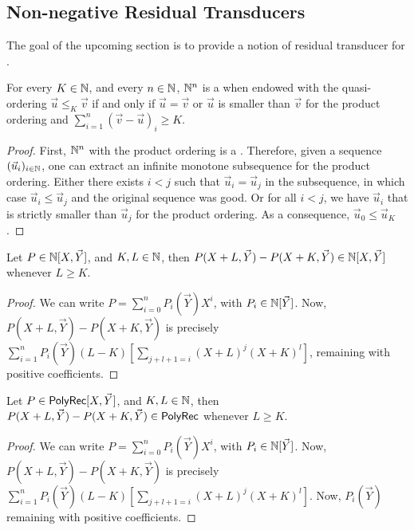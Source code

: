 \subsection{Non-negative Residual Transducers}

The goal of the upcoming section is to provide a notion of residual transducer
for  .

\begin{fact}
    For every $K \in \mathbb{N}$, and every $n \in \mathbb{N}$,
    $\mathbb{N}^n$ is a 
    when endowed with the quasi-ordering $\vec{u} \leq_K \vec{v}$
    if and only if $\vec{u} = \vec{v}$ or
    $\vec{u}$ is smaller than $\vec{v}$ for the product ordering and
    $\sum_{i = 1}^n  (\vec{v} - \vec{u})_i \geq K$.
\end{fact}
\begin{proof}
    First, $\mathbb{N}^n$ with the product ordering is a .
    Therefore, given a sequence $(\vec{u}_i)_{i \in \mathbb{N}}$,
    one can extract an infinite monotone subsequence for
    the product ordering.
    Either there exists $i < j$ such that $\vec{u}_i = \vec{u}_j$
    in the subsequence, in which case $\vec{u}_i \leq \vec{u}_j$
    and the original sequence was good. Or for all $i < j$,
    we have $\vec{u}_i$ that is strictly smaller than 
    $\vec{u}_j$ for the product ordering. As a consequence,
    $\vec{u}_0 \leq \vec{u}_K$.
\end{proof}


\begin{fact}
    Let $P \in \mathbb{N}[X,\vec{Y}]$, and $K,L \in \mathbb{N}$,
    then $P(X+L, \vec{Y}) - P(X+K,\vec{Y}) \in \mathbb{N}[X, \vec{Y}]$
    whenever $L \geq K$.
\end{fact}
\begin{proof}
    We can write
    $P = \sum_{i = 0}^n P_i(\vec{Y}) X^i$, with $P_i \in \mathbb{N}[\vec{Y}]$.
    Now,
    $P(X+L,\vec{Y}) - P(X+K,\vec{Y})$
    is precisely
    $\sum_{i = 1}^n P_i(\vec{Y}) (L-K) \left[ \sum_{j + l + 1= i} (X+L)^j (X+K)^l \right]$,
    remaining with positive coefficients.
\end{proof}

\begin{fact}
    Let $P \in \mathsf{PolyRec}[X,\vec{Y}]$, and $K,L \in \mathbb{N}$,
    then $P(X+L, \vec{Y}) - P(X+K,\vec{Y}) \in \mathsf{PolyRec}$
    whenever $L \geq K$.
\end{fact}
\begin{proof}
    We can write
    $P = \sum_{i = 0}^n P_i(\vec{Y}) X^i$, with $P_i \in \mathbb{N}[\vec{Y}]$.
    Now,
    $P(X+L,\vec{Y}) - P(X+K,\vec{Y})$
    is precisely
    $\sum_{i = 1}^n P_i(\vec{Y}) (L-K) \left[ \sum_{j + l + 1= i} (X+L)^j (X+K)^l \right]$.
    Now, $P_i(\vec{Y})$
    remaining with positive coefficients.
\end{proof}

